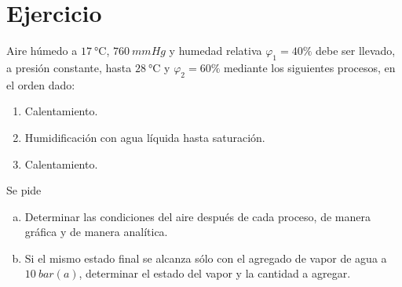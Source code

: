 \section{Ejercicio}\label{ej:Chap12Ejercicio09}
Aire húmedo a $\SI{17}{\celsius}$, $\SI{760}{mmHg}$ y humedad relativa $\varphi_1=40\%$ debe ser llevado, a presión constante, hasta $\SI{28}{\celsius}$ y $\varphi_2=60\%$ mediante los siguientes procesos, en el orden dado:
\begin{enumerate}
    \item Calentamiento.
    \item Humidificación con agua líquida hasta saturación.
    \item Calentamiento.
\end{enumerate}

Se pide
\begin{enumerate} [a)]
    \item Determinar las condiciones del aire después de cada proceso, de manera gráfica y de manera analítica.
    \item Si el mismo estado final se alcanza sólo con el agregado de vapor de agua a $\SI{10}{bar(a)}$, determinar el estado del vapor y la cantidad a agregar.
\end{enumerate}